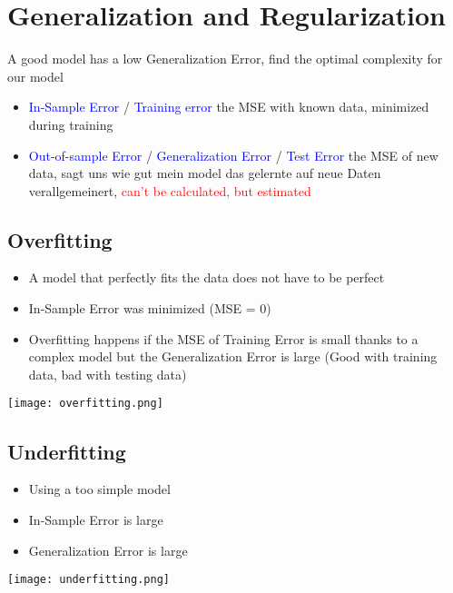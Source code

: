 \section{Generalization and Regularization}
A good model has a low Generalization Error, find the optimal complexity for our model \\

\begin{itemize}
    \item \textcolor{blue}{In-Sample Error} / \textcolor{blue}{Training error} the MSE with known data, minimized during training
    \item \textcolor{blue}{Out-of-sample Error} / \textcolor{blue}{Generalization Error} / \textcolor{blue}{Test Error} the MSE of new data, sagt uns wie gut mein model das gelernte auf neue Daten verallgemeinert, \textcolor{red}{can't be calculated, but estimated}
\end{itemize}

\subsection{Overfitting}
\begin{itemize}
    \item A model that perfectly fits the data does not have to be perfect
    \item In-Sample Error was minimized (MSE = 0)
    \item Overfitting happens if the MSE of Training Error is small thanks to a complex model but the Generalization Error is large (Good with training data, bad with testing data)
\end{itemize}
\texttt{[image: overfitting.png]}

\subsection{Underfitting}
\begin{itemize}
    \item Using a too simple model
    \item In-Sample Error is large
    \item Generalization Error is large
\end{itemize}

\texttt{[image: underfitting.png]}

